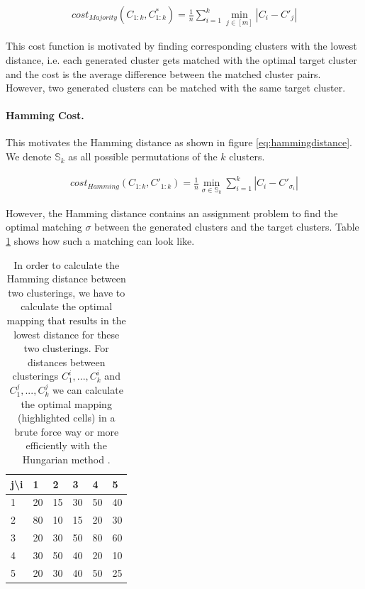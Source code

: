 \begin{equation}
    \begin{aligned}
        cost_{Majority}(C_{1:k}, C_{1:k}^*) = \frac{1}{n} \sum_{i=1}^k \min_{j \in [m]} |C_i - C'_j|
    \end{aligned}
    \label{eq:majoritydistance}
\end{equation}

This cost function is motivated by finding corresponding clusters with the lowest distance, i.e. each generated cluster gets matched with the optimal target cluster and the cost is the average difference between the matched cluster pairs. However, two generated clusters can be matched with the same target cluster. 

\paragraph{Hamming Cost.} This motivates the Hamming distance as shown in figure \ref{eq:hammingdistance}. We denote $\mathbb{S}_k$ as all possible permutations of the $k$ clusters.

\begin{equation}
    \begin{aligned}
        cost_{Hamming}(C_{1:k}, C'_{1:k}) = \frac{1}{n} \min_{\sigma \in \mathbb{S}_k} \sum_{i=1}^k |C_i - C'_{\sigma_i}|
    \end{aligned}
    \label{eq:hammingdistance}
\end{equation}

However, the Hamming distance contains an assignment problem to find the optimal matching $\sigma$ between the generated clusters and the target clusters. Table \ref{table:matching} shows how such a matching can look like.

\begin{table}[h]
    \centering
    \begin{tabular}{|l | l l l l l|}
    \hline
    j\textbackslash i & 1 & 2 & 3 & 4 & 5\\ \hline
    1 & 20 & \cellcolor{blue!25}15 & 30 & 50 & 40\\
    2 & 80 & 10 & \cellcolor{blue!25}15 & 20 & 30\\
    3 & \cellcolor{blue!25}20 & 30 & 50 & 80 & 60\\
    4 & 30 & 50 & 40 & \cellcolor{blue!25}20 & 10\\
    5 & 20 & 30 & 40 & 50 & \cellcolor{blue!25}25\\ \hline
    \end{tabular}
    \caption{In order to calculate the Hamming distance between two clusterings, we have to calculate the optimal mapping that results in the lowest distance for these two clusterings. For distances between clusterings $C_1^i, ..., C_k^i$ and $C_1^j, ..., C_k^j$ we can calculate the optimal mapping (highlighted cells) in a brute force way or more efficiently with the Hungarian method \cite{kuhn1955hungarian, munkres1957algorithms}.}
    \label{table:matching}
\end{table}

